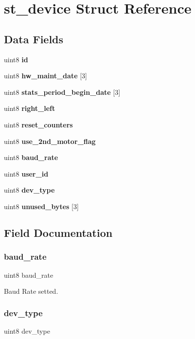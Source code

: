 \section{st\+\_\+device Struct Reference}
\label{structst__device}
\subsection*{Data Fields}
\begin{DoxyCompactItemize}
\item 
uint8 \textbf{ id}
\item 
uint8 \textbf{ hw\+\_\+maint\+\_\+date} [3]
\item 
uint8 \textbf{ stats\+\_\+period\+\_\+begin\+\_\+date} [3]
\item 
uint8 \textbf{ right\+\_\+left}
\item 
uint8 \textbf{ reset\+\_\+counters}
\item 
uint8 \textbf{ use\+\_\+2nd\+\_\+motor\+\_\+flag}
\item 
uint8 \textbf{ baud\+\_\+rate}
\item 
uint8 \textbf{ user\+\_\+id}
\item 
uint8 \textbf{ dev\+\_\+type}
\item 
uint8 \textbf{ unused\+\_\+bytes} [3]
\end{DoxyCompactItemize}


\subsection{Field Documentation}
\mbox{\label{structst__device_a1a2b3002580421effeca67955a862580}} 
\subsubsection{baud\+\_\+rate}
{\footnotesize\ttfamily uint8 baud\+\_\+rate}

Baud Rate setted. \mbox{\label{structst__device_a1208f1e877bd873eff225b2b1779f386}} 
\subsubsection{dev\+\_\+type}
{\footnotesize\ttfamily uint8 dev\+\_\+type}

